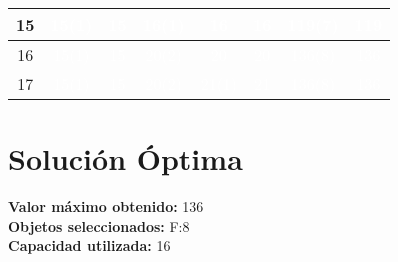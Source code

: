 \documentclass{article}
\begin{document}
\begin{center}
\begin{tabular}{|c|c|c|c|c|c|c|c|}
15 & \cellcolor{verde}\textcolor{white}{15(1)} & \cellcolor{rojo}\textcolor{white}{15} & \cellcolor{verde}\textcolor{white}{16(1)} & \cellcolor{rojo}\textcolor{white}{16} & \cellcolor{rojo}\textcolor{white}{16} & \cellcolor{verde}\textcolor{white}{119(7)} & \cellcolor{rojo}\textcolor{white}{119} \\ \hline
16 & \cellcolor{verde}\textcolor{white}{15(1)} & \cellcolor{rojo}\textcolor{white}{15} & \cellcolor{verde}\textcolor{white}{20(2)} & \cellcolor{rojo}\textcolor{white}{20} & \cellcolor{rojo}\textcolor{white}{20} & \cellcolor{verde}\textcolor{white}{136(8)} & \cellcolor{rojo}\textcolor{white}{136} \\ \hline
17 & \cellcolor{verde}\textcolor{white}{15(1)} & \cellcolor{rojo}\textcolor{white}{15} & \cellcolor{verde}\textcolor{white}{20(2)} & \cellcolor{verde}\textcolor{white}{21(1)} & \cellcolor{rojo}\textcolor{white}{21} & \cellcolor{verde}\textcolor{white}{136(8)} & \cellcolor{rojo}\textcolor{white}{136} \\ \hline
\end{tabular}
\end{center}
\normalsize

\section*{Solución Óptima}
\textbf{Valor máximo obtenido:} 136\\
\textbf{Objetos seleccionados:} F:8\\
\textbf{Capacidad utilizada:} 16\\
\end{document}
